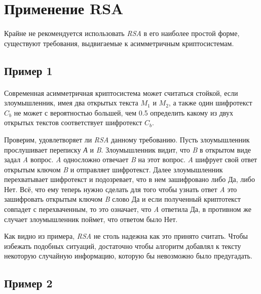 \section{Применение RSA}

\paragraph{} Крайне не рекомендуется использовать \textit{RSA} в его наиболее простой форме, существуют требования, выдвигаемые к асимметричным криптосистемам.

\subsection{Пример 1}

\paragraph{} Современная асимметричная криптосистема может считаться стойкой, если злоумышленник, имея два открытых текста {$M_1$} и 
  {$M_2$}, а также один шифротекст {$C_b$} не может с вероятностью большей, чем 0.5 определить какому из двух 
  открытых текстов соответствует шифротекст {$C_b$}.

  Проверим, удовлетворяет ли \textit{RSA} данному требованию. Пусть злоумышленник прослушивает переписку \textit{А} и \textit{B}. Злоумышленник видит, что 
  \textit{B} в открытом виде задал \textit{A} вопрос. \textit{A} односложно отвечает \textit{B} на этот вопрос. \textit{A} шифрует свой ответ открытым ключом
  \textit{B} и отправляет шифротекст. Далее злоумышленник перехватывает шифротекст и подозревает, что в нем зашифровано либо Да, либо Нет. Всё, что ему 
  теперь нужно сделать для того чтобы узнать ответ \textit{A} это зашифровать открытым ключом \textit{B} слово Да и если полученный криптотекст совпадет 
  с перехваченным, то это означает, что \textit{A} ответила Да, в противном же случает злоумышленник поймет, что ответом было Нет.

  Как видно из примера, \textit{RSA} не столь надежна как это принято считать. Чтобы избежать подобных ситуаций, достаточно чтобы алгоритм добавлял к 
  тексту некоторую случайную информацию, которую бы невозможно было предугадать. 

\subsection{Пример 2}

